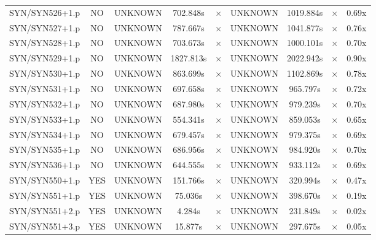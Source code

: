 \documentclass[a4paper,10pt]{article}
\begin{document}
\begin{longtable}{lcccccccc}
SYN/SYN526+1.p & NO & UNKNOWN & 702.848s & \cellcolor{mismatchcolor}$\times$ & UNKNOWN & 1019.884s & \cellcolor{mismatchcolor}$\times$ & 0.69x \\
SYN/SYN527+1.p & NO & UNKNOWN & 787.667s & \cellcolor{mismatchcolor}$\times$ & UNKNOWN & 1041.877s & \cellcolor{mismatchcolor}$\times$ & 0.76x \\
SYN/SYN528+1.p & NO & UNKNOWN & 703.673s & \cellcolor{mismatchcolor}$\times$ & UNKNOWN & 1000.101s & \cellcolor{mismatchcolor}$\times$ & 0.70x \\
SYN/SYN529+1.p & NO & UNKNOWN & 1827.813s & \cellcolor{mismatchcolor}$\times$ & UNKNOWN & 2022.942s & \cellcolor{mismatchcolor}$\times$ & 0.90x \\
SYN/SYN530+1.p & NO & UNKNOWN & 863.699s & \cellcolor{mismatchcolor}$\times$ & UNKNOWN & 1102.869s & \cellcolor{mismatchcolor}$\times$ & 0.78x \\
SYN/SYN531+1.p & NO & UNKNOWN & 697.658s & \cellcolor{mismatchcolor}$\times$ & UNKNOWN & 965.797s & \cellcolor{mismatchcolor}$\times$ & 0.72x \\
SYN/SYN532+1.p & NO & UNKNOWN & 687.980s & \cellcolor{mismatchcolor}$\times$ & UNKNOWN & 979.239s & \cellcolor{mismatchcolor}$\times$ & 0.70x \\
SYN/SYN533+1.p & NO & UNKNOWN & 554.341s & \cellcolor{mismatchcolor}$\times$ & UNKNOWN & 859.053s & \cellcolor{mismatchcolor}$\times$ & 0.65x \\
SYN/SYN534+1.p & NO & UNKNOWN & 679.457s & \cellcolor{mismatchcolor}$\times$ & UNKNOWN & 979.375s & \cellcolor{mismatchcolor}$\times$ & 0.69x \\
SYN/SYN535+1.p & NO & UNKNOWN & 686.956s & \cellcolor{mismatchcolor}$\times$ & UNKNOWN & 984.920s & \cellcolor{mismatchcolor}$\times$ & 0.70x \\
SYN/SYN536+1.p & NO & UNKNOWN & 644.555s & \cellcolor{mismatchcolor}$\times$ & UNKNOWN & 933.112s & \cellcolor{mismatchcolor}$\times$ & 0.69x \\
SYN/SYN550+1.p & YES & UNKNOWN & 151.766s & \cellcolor{mismatchcolor}$\times$ & UNKNOWN & 320.994s & \cellcolor{mismatchcolor}$\times$ & 0.47x \\
SYN/SYN551+1.p & YES & UNKNOWN & 75.036s & \cellcolor{mismatchcolor}$\times$ & UNKNOWN & 398.670s & \cellcolor{mismatchcolor}$\times$ & 0.19x \\
SYN/SYN551+2.p & YES & UNKNOWN & 4.284s & \cellcolor{mismatchcolor}$\times$ & UNKNOWN & 231.849s & \cellcolor{mismatchcolor}$\times$ & 0.02x \\
SYN/SYN551+3.p & YES & UNKNOWN & 15.877s & \cellcolor{mismatchcolor}$\times$ & UNKNOWN & 297.675s & \cellcolor{mismatchcolor}$\times$ & 0.05x \\

\end{longtable}
\end{document}
